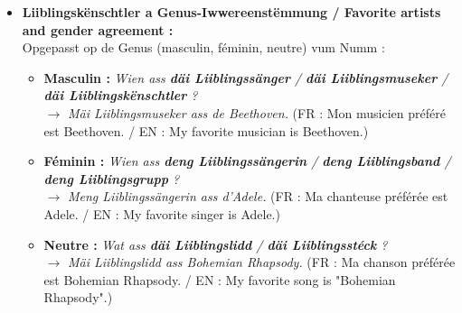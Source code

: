 \begin{itemize}
    \vspace{0.4em}

    \item \textbf{Liiblingskënschtler a Genus-Iwwereenstëmmung / Favorite artists and gender agreement :} \\
    Opgepasst op de Genus (masculin, féminin, neutre) vum Numm :
    \begin{itemize}
        \item \textbf{Masculin :} \textit{Wien ass \textbf{däi Liiblingssänger} / \textbf{däi Liiblingsmuseker} / \textbf{däi Liiblingskënschtler} ?} \\
        $\rightarrow$ \textit{Mäi Liiblingsmuseker ass de Beethoven.} (FR : Mon musicien préféré est Beethoven. / EN : My favorite musician is Beethoven.)
        \item \textbf{Féminin :} \textit{Wien ass \textbf{deng Liiblingssängerin} / \textbf{deng Liiblingsband} / \textbf{deng Liiblingsgrupp} ?} \\
        $\rightarrow$ \textit{Meng Liiblingssängerin ass d'Adele.} (FR : Ma chanteuse préférée est Adele. / EN : My favorite singer is Adele.)
        \item \textbf{Neutre :} \textit{Wat ass \textbf{däi Liiblingslidd} / \textbf{däi Liiblingsstéck} ?} \\
        $\rightarrow$ \textit{Mäi Liiblingslidd ass \flqq Bohemian Rhapsody\frqq.} (FR : Ma chanson préférée est \flqq Bohemian Rhapsody\frqq. / EN : My favorite song is "Bohemian Rhapsody".)
    \end{itemize}

    \vspace{0.4em}


\end{itemize}
